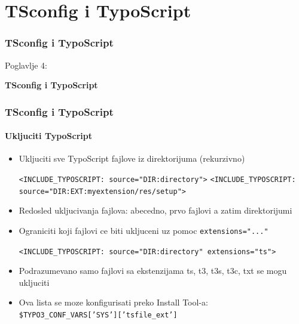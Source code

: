%

\section{TSconfig i TypoScript}
\begin{frame}[fragile]
	\frametitle{TSconfig i TypoScript}

	\begin{center}\huge{Poglavlje 4:}\end{center}
	\begin{center}\huge{\color{typo3darkgrey}\textbf{TSconfig i TypoScript}}\end{center}

\end{frame}


\begin{frame}[fragile]
	\frametitle{TSconfig i TypoScript}
	\framesubtitle{Ukljuciti TypoScript}

	\begin{itemize}
		\item Ukljuciti sve TypoScript fajlove iz direktorijuma (rekurzivno)

			\lstinline!<INCLUDE_TYPOSCRIPT: source="DIR:directory">!
			\lstinline!<INCLUDE_TYPOSCRIPT: source="DIR:EXT:myextension/res/setup">!

		\item Redosled ukljucivanja fajlova:\newline
			abecedno, prvo fajlovi a zatim direktorijumi
		\item Ograniciti koji fajlovi ce biti ukljuceni uz pomoc \texttt{extensions="..."}

			\lstinline!<INCLUDE_TYPOSCRIPT: source="DIR:directory" extensions="ts">!

		\item Podrazumevano samo fajlovi sa ekstenzijama ts, t3, t3s, t3c, txt se mogu ukljuciti
		\item Ova lista se moze konfigurisati preko Install Tool-a:\newline
			\texttt{\$TYPO3\_CONF\_VARS['SYS']['tsfile\_ext']}
	\end{itemize}

\end{frame}

